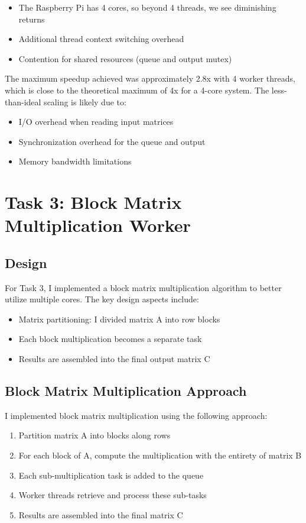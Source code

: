 \documentclass[11pt,a4paper]{article}
\begin{document}
\begin{itemize}
    \item The Raspberry Pi has 4 cores, so beyond 4 threads, we see diminishing returns
    \item Additional thread context switching overhead
    \item Contention for shared resources (queue and output mutex)
\end{itemize}

The maximum speedup achieved was approximately 2.8x with 4 worker threads, which is close to the theoretical maximum of 4x for a 4-core system. The less-than-ideal scaling is likely due to:

\begin{itemize}
    \item I/O overhead when reading input matrices
    \item Synchronization overhead for the queue and output
    \item Memory bandwidth limitations
\end{itemize}

\section{Task 3: Block Matrix Multiplication Worker}

\subsection{Design}
For Task 3, I implemented a block matrix multiplication algorithm to better utilize multiple cores. The key design aspects include:

\begin{itemize}
    \item Matrix partitioning: I divided matrix A into row blocks
    \item Each block multiplication becomes a separate task
    \item Results are assembled into the final output matrix C
\end{itemize}

\subsection{Block Matrix Multiplication Approach}
I implemented block matrix multiplication using the following approach:

\begin{enumerate}
    \item Partition matrix A into blocks along rows
    \item For each block of A, compute the multiplication with the entirety of matrix B
    \item Each sub-multiplication task is added to the queue
    \item Worker threads retrieve and process these sub-tasks
    \item Results are assembled into the final matrix C
\end{enumerate}
\end{document}

